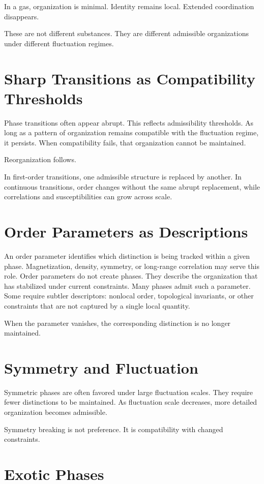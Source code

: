 \documentclass[11pt,twoside,openright]{book}
\begin{document}
In a gas, organization is minimal. Identity remains local. Extended coordination disappears.

These are not different substances.
They are different admissible organizations
under different fluctuation regimes.
\section*{Sharp Transitions as Compatibility Thresholds}

Phase transitions often appear abrupt. This reflects admissibility thresholds. As long as a pattern of organization remains compatible with the fluctuation regime, it persists. When compatibility fails, that organization cannot be maintained.

Reorganization follows.

In first-order transitions,
one admissible structure is replaced by another.
In continuous transitions,
order changes without the same abrupt replacement,
while correlations and susceptibilities can grow across scale.
\section*{Order Parameters as Descriptions}

An order parameter identifies which distinction is being tracked within a given phase. Magnetization, density, symmetry, or long-range correlation may serve this role. Order parameters do not create phases. They describe the organization that has stabilized under current constraints. Many phases admit such a parameter. Some require subtler descriptors: nonlocal order, topological invariants, or other constraints that are not captured by a single local quantity.

When the parameter vanishes,
the corresponding distinction
is no longer maintained.
\section*{Symmetry and Fluctuation}

Symmetric phases are often favored under large fluctuation scales. They require fewer distinctions to be maintained. As fluctuation scale decreases, more detailed organization becomes admissible.

Symmetry breaking is not preference.
It is compatibility with changed constraints.
\section*{Exotic Phases}
\end{document}
